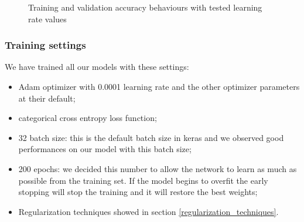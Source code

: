			\begin{figure}[!h] 
				\hspace*{\fill}
				\hspace*{\fill}
				\caption{Training and validation accuracy behaviours with tested learning rate values}
				\label{fig:val_acc_lr}
			\end{figure}
			
		\subsubsection{Training settings} \label{training_settings}
		
			We have trained all our models with these settings:
			\begin{itemize}
				\item Adam optimizer with 0.0001 learning rate and the other optimizer parameters at their default;
				\item categorical cross entropy loss function;
				\item 32 batch size: this is the default batch size in keras and we observed good performances on our model with this batch size;
				\item 200 epochs: we decided this number to allow the network to learn as much as possible from the training set. If the model begins to overfit the early stopping will stop the training and it will restore the best weights;
				\item Regularization techniques showed in section \ref{regularization_techniques}.
			\end{itemize}
		
